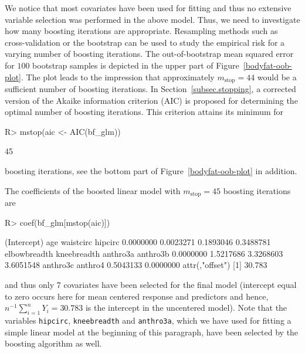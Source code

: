 \documentclass{article}
\newcommand{\Robject}[1]{\texttt{#1}}
\newenvironment{Schunk}{}{}
\begin{document}
We notice that most covariates have been used for fitting
and thus no extensive variable selection was performed in the above model. 
Thus, we need to investigate how many boosting iterations are appropriate. Resampling
methods such as cross-validation or the bootstrap can be used to study the 
empirical risk for a varying number of boosting iterations. The out-of-bootstrap mean 
squared error for $100$ bootstrap samples is depicted in the upper part of 
Figure~\ref{bodyfat-oob-plot}. The plot
leads to the impression that approximately $m_\text{stop} = 44$ would be a sufficient
number of boosting iterations.
In Section~\ref{subsec.stopping}, a corrected version of the Akaike
information criterion (AIC) is proposed for determining the optimal number
of boosting iterations. This criterion attains its 
minimum for
\begin{Schunk}
\begin{Sinput}
R> mstop(aic <- AIC(bf_glm))
\end{Sinput}
\begin{Soutput}
[1] 45
\end{Soutput}
\end{Schunk}
boosting iterations, see the bottom part of
Figure~\ref{bodyfat-oob-plot} in addition.

The coefficients of the boosted linear model with 
$m_\text{stop} = 45$ 
boosting iterations are
\begin{Schunk}
\begin{Sinput}
R> coef(bf_glm[mstop(aic)])
\end{Sinput}
\begin{Soutput}
 (Intercept)          age    waistcirc      hipcirc 
   0.0000000    0.0023271    0.1893046    0.3488781 
elbowbreadth  kneebreadth     anthro3a     anthro3b 
   0.0000000    1.5217686    3.3268603    3.6051548 
    anthro3c      anthro4 
   0.5043133    0.0000000 
attr(,"offset")
[1] 30.783
\end{Soutput}
\end{Schunk}
and thus only 7 covariates have been selected for the final
model (intercept equal to zero occurs here for mean centered response and
predictors and hence, 
$n^{-1} \sum_{i=1}^n Y_i = 30.783$
is the intercept in the uncentered model). Note that   
the variables \Robject{hipcirc}, \Robject{kneebreadth} and
\Robject{anthro3a}, which 
we have used for fitting a simple linear model at the beginning of this
paragraph, have been selected by the boosting algorithm as well. 
\end{document}
